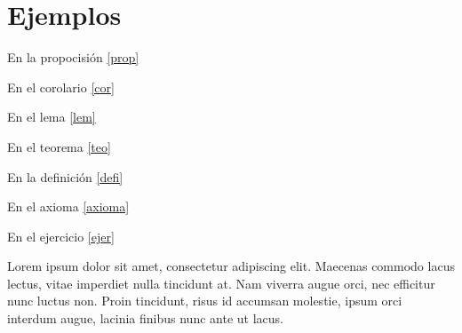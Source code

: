 \chapter{Ejemplos}

\begin{prop}[Nombre]\label{prop}
    \lipsum[2]
\end{prop}

\begin{prop}\label{prop1}
    \lipsum[2]
\end{prop}

En la propocisión \ref{prop}

\begin{cor}\label{cor}
    \lipsum[2-3]
\end{cor}

En el corolario \ref{cor}

\begin{lem}\label{lem}
    \lipsum[2]
\end{lem}

En el lema \ref{lem}

\begin{teo}\label{teo}
    \lipsum[2-3]
\end{teo}

En el teorema \ref{teo}

\begin{defi}[Hola]\label{defi}
    \lipsum[2]
\end{defi}


En la definición \ref{defi}

\begin{axioma}\label{axioma}
    \lipsum[2]
\end{axioma}

En el axioma \ref{axioma}

\begin{ejer}\label{ejer}
    \lipsum[2]
\end{ejer}

En el ejercicio \ref{ejer}

\newpage

\begin{pcuno}
    Lorem ipsum dolor sit amet, consectetur adipiscing elit. Maecenas commodo lacus lectus, vitae imperdiet nulla tincidunt at. Nam viverra augue orci, nec efficitur nunc luctus non. Proin tincidunt, risus id accumsan molestie, ipsum orci interdum augue, lacinia finibus nunc ante ut lacus.
\end{pcuno}

